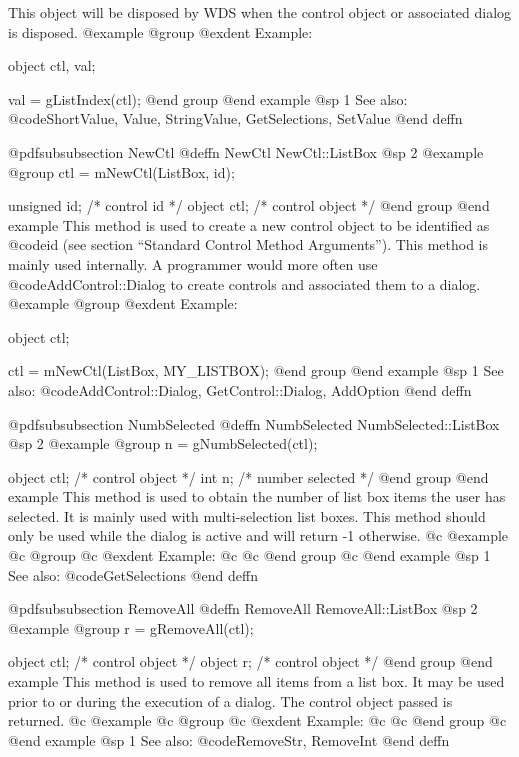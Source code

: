 This object will be disposed by WDS when the control object or
associated dialog is disposed.
@example
@group
@exdent Example:

object  ctl, val;

val = gListIndex(ctl);
@end group
@end example
@sp 1
See also:  @code{ShortValue, Value, StringValue, GetSelections, SetValue}
@end deffn




@pdfsubsubsection {NewCtl}
@deffn {NewCtl} NewCtl::ListBox
@sp 2
@example
@group
ctl = mNewCtl(ListBox, id);

unsigned  id;   /*  control id      */
object   ctl;   /*  control object  */
@end group
@end example
This method is used to create a new control object to be identified as
@code{id} (see section ``Standard Control Method Arguments'').  This
method is mainly used internally.  A programmer would more often
use @code{AddControl::Dialog} to create controls and associated them
to a dialog.
@example
@group
@exdent Example:

object  ctl;

ctl = mNewCtl(ListBox, MY_LISTBOX);
@end group
@end example
@sp 1
See also:  @code{AddControl::Dialog, GetControl::Dialog, AddOption}
@end deffn











@pdfsubsubsection {NumbSelected}
@deffn {NumbSelected} NumbSelected::ListBox
@sp 2
@example
@group
n = gNumbSelected(ctl);

object  ctl;    /*  control object   */
int     n;      /*  number selected  */
@end group
@end example
This method is used to obtain the number of list box items the user
has selected.  It is mainly used with multi-selection list boxes.
This method should only be used while the dialog is active and
will return -1 otherwise.
@c @example
@c @group
@c @exdent Example:
@c 
@c @end group
@c @end example
@sp 1
See also:  @code{GetSelections}
@end deffn














@pdfsubsubsection {RemoveAll}
@deffn {RemoveAll} RemoveAll::ListBox
@sp 2
@example
@group
r = gRemoveAll(ctl);

object  ctl;    /*  control object  */
object  r;      /*  control object  */
@end group
@end example
This method is used to remove all items from a list box.  It may be used
prior to or during the execution of a dialog.  The control object passed
is returned.
@c @example
@c @group
@c @exdent Example:
@c 
@c @end group
@c @end example
@sp 1
See also:  @code{RemoveStr, RemoveInt}
@end deffn
















